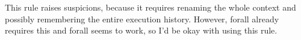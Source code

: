 \documentclass[12pt]{cmuthesis}
\theoremstyle{definition}
\theoremstyle{remark}
\begin{document}
This rule raises suspicions, because it requires renaming the whole context and possibly remembering the entire execution history.
However, forall already requires this and forall seems to work, so I'd be okay with using this rule.
\end{document}
